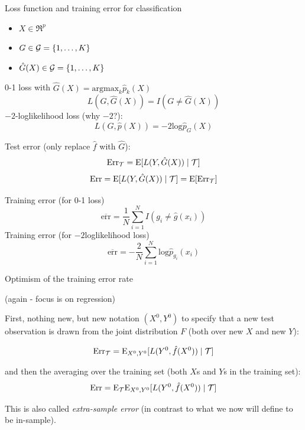 \documentclass[
  ignorenonframetext,
]{beamer}
\providecommand{\tightlist}{%
  \setlength{\itemsep}{0pt}\setlength{\parskip}{0pt}}
\begin{document}
\begin{frame}

\begin{block}{Loss function and training error for classification}

\begin{itemize}
\tightlist
\item
  \(X \in \Re^p\)
\item
  \(G \in {\cal G}=\{1,\ldots,K\}\)
\item
  \(\hat{G}(X) \in {\cal G}=\{1,\ldots,K\}\)
\end{itemize}

0-1 loss with \(\hat{G}(X)=\text{argmax}_k \hat{p}_k(X)\)
\[L(G,\hat{G}(X))=I(G\neq \hat{G}(X))\] \(-2\)-loglikelihood loss (why
\(-2\)?): \[ L(G,\hat{p}(X))=-2 \text{log} \hat{p}_G(X)\]

\end{block}

\end{frame}

\begin{frame}

Test error (only replace \(\hat{f}\) with \(\hat{G}\)):
\[ \text{Err}_{\cal T}=\text{E}[L(Y,\hat{G}(X))\mid {\cal T}]\]
\[ \text{Err}=\text{E}[L(Y,\hat{G}(X))\mid {\cal T}]=\text{E} [\text{Err}_{\cal T}]\]

Training error (for 0-1 loss)
\[\overline{\text{err}}=\frac{1}{N}\sum_{i=1}^N I(g_i\neq \hat{g}(x_i))\]
Training error (for \(-2\)loglikelihood loss)
\[\overline{\text{err}}=-\frac{2}{N}\sum_{i=1}^N \text{log}\hat{p}_{g_i}(x_i)\]

\end{frame}

\begin{frame}

\begin{block}{Optimism of the training error rate}

(again - focus is on regression)

First, nothing new, but new notation \((X^0,Y^0)\) to specify that a new
test observation is drawn from the joint distribution \(F\) (both over
new \(X\) and new \(Y\)):

\[\text{Err}_{\cal T}=\text{E}_{X^0,Y^0}[L(Y^0,\hat{f}(X^0))\mid {\cal T}]\]

and then the averaging over the training set (both \(X\)s and \(Y\)s in
the training set):
\[\text{Err}=\text{E}_{\cal T} \text{E}_{X^0,Y^0}[L(Y^0,\hat{f}(X^0))\mid {\cal T}]\]

This is also called \emph{extra-sample error} (in contrast to what we
now will define to be in-sample).

\end{block}

\end{frame}
\end{document}
